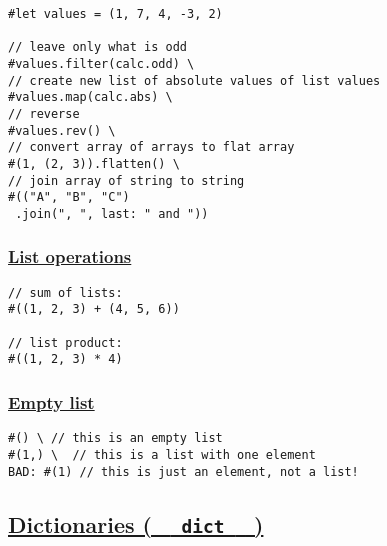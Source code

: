 \begin{verbatim}
#let values = (1, 7, 4, -3, 2)

// leave only what is odd
#values.filter(calc.odd) \
// create new list of absolute values of list values
#values.map(calc.abs) \
// reverse
#values.rev() \
// convert array of arrays to flat array
#(1, (2, 3)).flatten() \
// join array of string to string
#(("A", "B", "C")
 .join(", ", last: " and "))
\end{verbatim}

\pandocbounded{}

\subsubsection{\texorpdfstring{\hyperref[list-operations]{List
operations}}{List operations}}\label{list-operations}

\begin{verbatim}
// sum of lists:
#((1, 2, 3) + (4, 5, 6))

// list product:
#((1, 2, 3) * 4)
\end{verbatim}

\pandocbounded{}

\subsubsection{\texorpdfstring{\hyperref[empty-list]{Empty
list}}{Empty list}}\label{empty-list}

\begin{verbatim}
#() \ // this is an empty list
#(1,) \  // this is a list with one element
BAD: #(1) // this is just an element, not a list!
\end{verbatim}

\pandocbounded{}

\subsection{\texorpdfstring{\hyperref[dictionaries-dict]{Dictionaries (
\texttt{\ }{\texttt{\ dict\ }}\texttt{\ }
)}}{Dictionaries (   dict   )}}\label{dictionaries-dict}

